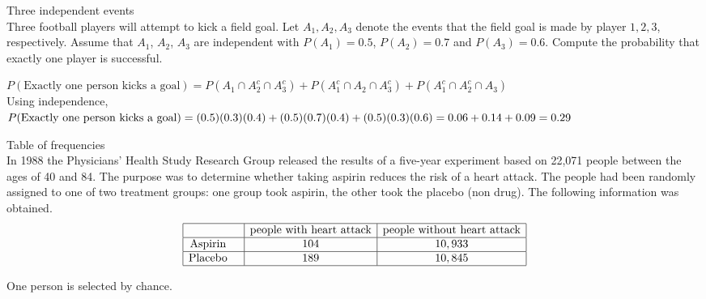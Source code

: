 \documentclass[bigtut]{tutorial}\usepackage[]{graphicx}\usepackage[]{color}
\begin{document}
\begin{tutorial}
\begin{questions}
\begin{solution}
\end{solution}


\question Three independent events \\

 Three football players will
attempt to kick a field goal. Let $A_1,A_2,A_3$ denote the events
that the field goal is made by player $1,2,3$, respectively. Assume
that $A_1$, $A_2$, $A_3$ are independent with $P(A_1)=0.5$,
$P(A_2)=0.7$ and $P(A_3)=0.6$. Compute the probability that exactly one
player is successful.


\begin{solution}
$P(\text{Exactly one person kicks a goal}) 
= P(A_1 \cap A_2^c \cap A_3^c) + P(A_1^c \cap A_2 \cap A_3^c) + P(A_1^c \cap A_2^c \cap A_3)$ \\

Using independence, \\
$P(\text{Exactly one person kicks a goal}) \\
= (0.5)(0.3)(0.4) + (0.5)(0.7)(0.4) + (0.5)(0.3)(0.6) \\
= 0.06+0.14+0.09 \\
= 0.29$

\end{solution}

\question Table of frequencies \\

In 1988 the Physicians' Health Study Research Group released
the results of a five-year experiment based on 22,071 people
between the ages of 40 and 84. The purpose was to determine whether
taking aspirin reduces the risk of a heart attack. The people had
been randomly assigned to one of two treatment groups: one group
took aspirin, the other took the placebo (non drug). The following information was
obtained.
$$
\begin{array}{|cl|c|c|}\hline
&& \mbox{\rm people with heart attack} & \mbox{\rm  people without heart
attack}
 \\\hline \mbox{\rm Aspirin}& & 104 &
10,933\\\hline \mbox{\rm Placebo}&  & 189 & 10,845 \\\hline
\end{array}
$$

\vspace{.5cm}
One person is selected by chance.
\end{questions}
\end{tutorial}
\end{document}
